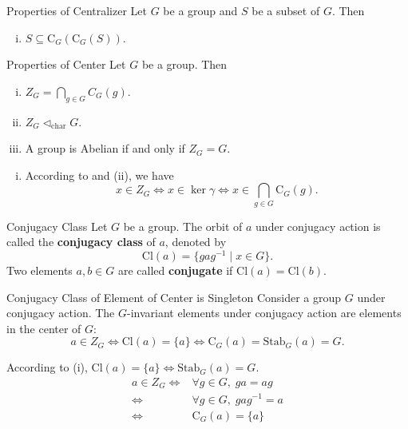 \begin{proposition}{Properties of Centralizer}{}
    Let $G$ be a group and $S$ be a subset of $G$. Then
    \begin{enumerate}[(i)]
        \item $S\subseteq\mathrm{C}_G(\mathrm{C}_G(S))$.
    \end{enumerate}
\end{proposition}

\begin{proposition}{Properties of Center}{}
    Let $G$ be a group. Then
    \begin{enumerate}[(i)]
        \item $Z_G=\bigcap_{g \in G} C_G(g)$.
        \item $Z_G\lhd_{\mathrm{char}} G$.
        \item A group is Abelian if and only if $Z_G=G$.
    \end{enumerate}
\end{proposition}
\begin{prf}
    \begin{enumerate}[(i)]
        \item According to  and  (ii), we have
              \[
                  x\in Z_G\iff x\in \ker \gamma\iff x\in
                  \bigcap\limits_{g\in G}\mathrm{C}_G(g).
              \]
    \end{enumerate}
\end{prf}

\begin{definition}{Conjugacy Class}{}
    Let $G$ be a group. The orbit of $a$ under conjugacy action is called the \textbf{conjugacy class} of $a$, denoted by
    \[
        \mathrm{Cl}(a)=\{ gag^{-1}\mid x\in G   \}.
    \]
    Two elements $a,b\in G$ are called \textbf{conjugate} if $\mathrm{Cl}(a)=\mathrm{Cl}(b)$.
\end{definition}


\begin{proposition}{Conjugacy Class of Element of Center is Singleton}{}
    Consider a group $G$ under conjugacy action. The $G$-invariant elements under conjugacy action are elements in the center of $G$:
    \[
        a\in Z_G\iff \mathrm{Cl}(a)=\{ a\}\iff \mathrm{C}_G(a)=\mathrm{Stab}_G(a)=G.
    \]
\end{proposition}
\begin{prf}
    According to  (i), $\mathrm{Cl}(a)=\{ a\}\iff \mathrm{Stab}_G(a)=G$.
    $$
        \begin{aligned}
            a  \in Z_G \iff & \forall g \in G,\;g a  =a g     \\
            \iff            & \forall g \in G,\;g a g^{-1} =a \\
            \iff            & \mathrm{C}_G(a) =\{a\}
        \end{aligned}
    $$
\end{prf}

